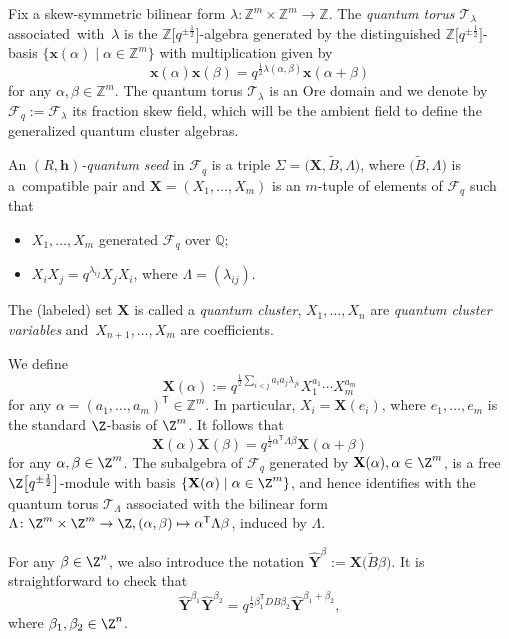  Fix a skew-symmetric bilinear form $\lambda\colon\mathbb{Z}^{m}\times \mathbb{Z}^m\to \mathbb{Z}$. The {\it quantum torus $\mathcal{T}_\lambda$} associated~with~$\lambda$ is the $\mathbb{Z}\big[q^{\pm\frac{1}{2}}\big]$-algebra generated by the distinguished $\mathbb{Z}\big[q^{\pm\frac{1}{2}}\big]$-basis $\{\mathbf{x}(\alpha)\mid \alpha\in \mathbb{Z}^m\}$ with multiplication given by
\[
\mathbf{x}(\alpha)\mathbf{x}(\beta)=q^{\frac{1}{2}\lambda(\alpha,\beta)}\mathbf{x}(\alpha+\beta)
\]
for any $\alpha,\beta\in \mathbb{Z}^m$. The quantum torus $\mathcal{T}_\lambda$ is an Ore domain and we denote by $\mathcal{F}_q:=\mathcal{F}_\lambda$ its fraction skew field, which will be the ambient field to define the generalized quantum cluster algebras.
\begin{Definition}
 An {\it $(R,\mathbf{h})$-quantum seed} in $\mathcal{F}_q$ is a triple $\Sigma=\bigl(\mathbf{X},\tilde{B},\Lambda\bigr)$, where $\bigl(\tilde{B},\Lambda\bigr)$ is a~compatible pair and $\mathbf{X}=(X_1,\dots, X_m)$ is an $m$-tuple of elements of $\mathcal{F}_q$ such that
 \begin{itemize}\itemsep=0pt
 \item $X_1,\dots, X_{m}$ generated $\mathcal{F}_q$ over $\mathbb{Q}$;
 \item $X_iX_j=q^{\lambda_{ij}}X_jX_i$, where $\Lambda=(\lambda_{ij})$.
 \end{itemize}
 The (labeled) set $\mathbf{X}$ is called a {\it quantum cluster}, $X_1,\dots, X_n$ are {\it quantum cluster variables} and~${X_{n+1},\dots, X_m}$ are coefficients.
\end{Definition}
We define \[\mathbf{X}(\alpha):=q^{\frac{1}{2}\sum_{i<j}a_ia_j\lambda_{ji}}X_1^{a_1}\cdots X_{m}^{a_{m}}\] for any $\alpha=(a_1,\dots, a_{m})^{\mathsf T}\in \mathbb{Z}^{m}$. In particular, $X_i=\mathbf{X}(e_i)$, where $e_1,\dots, e_m$ is the standard $\Z$-basis of $\Z^m$.
It follows that
 \[
 \mathbf{X}(\alpha) \mathbf{X}(\beta)=q^{\frac{1}{2}\alpha^{\mathsf T}\Lambda \beta}\mathbf{X}({\alpha+\beta})
 \]
 for any $\alpha,\beta\in \Z^{m}$. The subalgebra of $\mathcal{F}_q$ generated by $\mathbf{X}(\alpha), \alpha\in \Z^{m}$, is a free $\Z\big[q^{\pm\frac{1}{2}}\big]$-module with basis $\{\mathbf{X}(\alpha) \mid \alpha\in \Z^{m}\}$, and hence identifies with the quantum torus $\mathcal{T}_\Lambda$ associated with the bilinear form $\Lambda\colon\Z^m\times \Z^m\to \Z, (\alpha,\beta)\mapsto \alpha^{\mathsf T}\Lambda \beta$, induced by $\Lambda$.

 For any $\beta\in \Z^n$, we also introduce the notation
$
 \hat{\mathbf{Y}}^{\beta}:=\mathbf{X}\bigl(\tilde{B}\beta\bigr)$.
 It is straightforward to check that
 \[
 \hat{\mathbf{Y}}^{\beta_1}\hat{\mathbf{Y}}^{\beta_2}=q^{\frac{1}{2}\beta_1^{\mathsf T}DB\beta_2}\hat{\mathbf{Y}}^{\beta_1+\beta_2},
 \]
 where $\beta_1,\beta_2\in \Z^n$.

